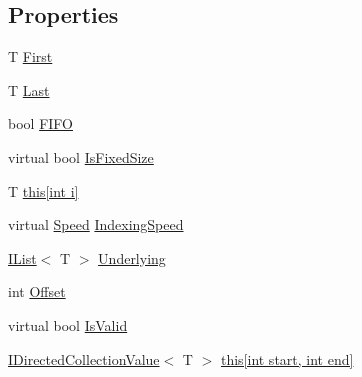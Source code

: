 \subsection*{Properties}
\begin{DoxyCompactItemize}
\item 
T \hyperlink{class_c5_1_1_guarded_list_a3bb363d3e068cef40c9fabfc68bb16c9}{First}
\item 
T \hyperlink{class_c5_1_1_guarded_list_a349b68d991e7be0f5c46e9f0d6031fb8}{Last}
\item 
bool \hyperlink{class_c5_1_1_guarded_list_a9319f85c3a8830d606126743172d00e6}{F\+I\+F\+O}
\item 
virtual bool \hyperlink{class_c5_1_1_guarded_list_acbe8502e77878bf3c50eacd4879e5909}{Is\+Fixed\+Size}
\item 
T \hyperlink{class_c5_1_1_guarded_list_ad5bc647309e81616d984c7713e4c84ff}{this\mbox{[}int i\mbox{]}}
\item 
virtual \hyperlink{namespace_c5_a615ba88dcdaa8d5a3c5f833a73d7fad6}{Speed} \hyperlink{class_c5_1_1_guarded_list_a153a69e81c48e5a2905fceb726aebc9e}{Indexing\+Speed}
\item 
\hyperlink{interface_c5_1_1_i_list}{I\+List}$<$ T $>$ \hyperlink{class_c5_1_1_guarded_list_af6565bed0e461d28b7f125481d22cc5f}{Underlying}
\item 
int \hyperlink{class_c5_1_1_guarded_list_afcec36d0e79fd5634866b62065f51d49}{Offset}
\item 
virtual bool \hyperlink{class_c5_1_1_guarded_list_a9f6857e8494abd309c9b4f4f92e5ab09}{Is\+Valid}
\item 
\hyperlink{interface_c5_1_1_i_directed_collection_value}{I\+Directed\+Collection\+Value}$<$ T $>$ \hyperlink{class_c5_1_1_guarded_list_a3aa22d62b09f2a0180cc5c1342eb4ce4}{this\mbox{[}int start, int end\mbox{]}}
\end{DoxyCompactItemize}

